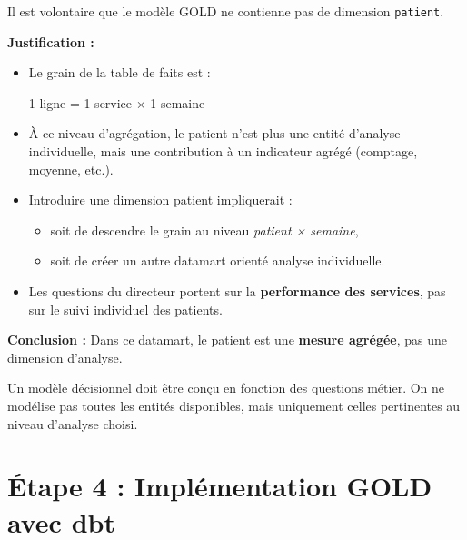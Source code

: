 \documentclass[11pt,a4paper]{article}
\begin{document}
\begin{tcolorbox}[title=\textbf{Pourquoi ne pas avoir créé de dimension patient ?}, colback=gray!5, colframe=black, boxrule=0.8pt, arc=2mm]

Il est volontaire que le modèle GOLD ne contienne pas de dimension \texttt{patient}.

\textbf{Justification :}

\begin{itemize}
\item Le grain de la table de faits est :  
\begin{center}
1 ligne = 1 service × 1 semaine
\end{center}

\item À ce niveau d’agrégation, le patient n’est plus une entité d’analyse individuelle, mais une contribution à un indicateur agrégé (comptage, moyenne, etc.).

\item Introduire une dimension patient impliquerait :
  \begin{itemize}
  \item soit de descendre le grain au niveau \textit{patient × semaine},
  \item soit de créer un autre datamart orienté analyse individuelle.
  \end{itemize}

\item Les questions du directeur portent sur la \textbf{performance des services}, pas sur le suivi individuel des patients.
\end{itemize}

\textbf{Conclusion :}  
Dans ce datamart, le patient est une \textbf{mesure agrégée}, pas une dimension d’analyse.

\end{tcolorbox}

\begin{tcolorbox}[colback=blue!5, colframe=blue!60, title=\textbf{Commentaire}]
Un modèle décisionnel doit être conçu en fonction des questions métier.
On ne modélise pas toutes les entités disponibles,
mais uniquement celles pertinentes au niveau d’analyse choisi.
\end{tcolorbox}


\section{Étape 4 : Implémentation GOLD avec dbt}
\end{document}
